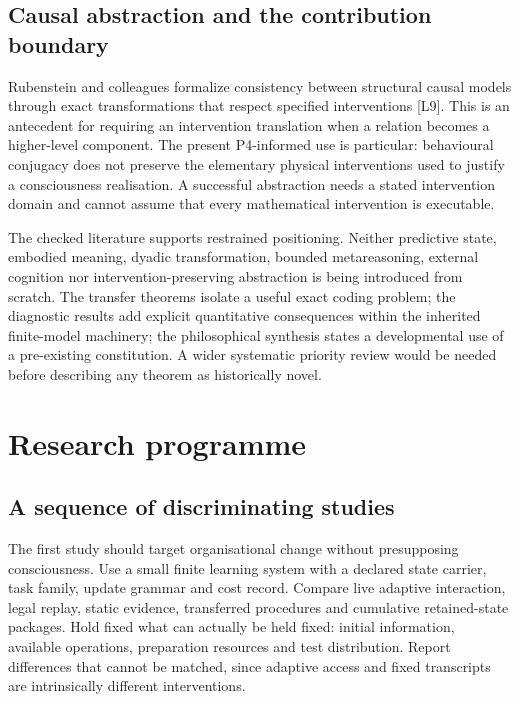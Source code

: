 \documentclass[
  11pt,
  a4paper,
]{article}
\begin{document}
\subsection{Causal abstraction and the contribution
boundary}\label{causal-abstraction-and-the-contribution-boundary}

Rubenstein and colleagues formalize consistency between structural
causal models through exact transformations that respect specified
interventions {[}L9{]}. This is an antecedent for requiring an
intervention translation when a relation becomes a higher-level
component. The present P4-informed use is particular: behavioural
conjugacy does not preserve the elementary physical interventions used
to justify a consciousness realisation. A successful abstraction needs a
stated intervention domain and cannot assume that every mathematical
intervention is executable.

The checked literature supports restrained positioning. Neither
predictive state, embodied meaning, dyadic transformation, bounded
metareasoning, external cognition nor intervention-preserving
abstraction is being introduced from scratch. The transfer theorems
isolate a useful exact coding problem; the diagnostic results add
explicit quantitative consequences within the inherited finite-model
machinery; the philosophical synthesis states a developmental use of a
pre-existing constitution. A wider systematic priority review would be
needed before describing any theorem as historically novel.

\section{Research programme}\label{research-programme}

\subsection{A sequence of discriminating
studies}\label{a-sequence-of-discriminating-studies}

The first study should target organisational change without presupposing consciousness. Use a small finite learning system with a declared state carrier, task family, update grammar and cost record. Compare live adaptive interaction, legal replay, static evidence, transferred procedures and cumulative retained-state packages. Hold fixed what can actually be held fixed: initial information, available operations, preparation resources and test distribution. Report differences that cannot be matched, since adaptive access and fixed transcripts are intrinsically different interventions.
\end{document}
